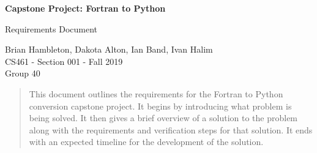 \begin{titlepage}
   \begin{center}
       \vspace*{1cm}
 
       \begin{center}
            \Large
            \textbf{Capstone Project: Fortran to Python}
        \end{center}{}
     
        \vspace{0.2cm}
        Requirements Document\\
        \vspace{0.3cm}
        
        Brian Hambleton, Dakota Alton, Ian Band, Ivan Halim\\
        CS461 - Section 001 - Fall 2019\\
        Group 40
        
 
        \vspace{1.5cm}
 
        \begin{abstract}
          This document outlines the requirements for the Fortran to Python conversion capstone project. It begins by introducing what problem is being solved. It then gives a brief overview of a solution to the problem along with the requirements and verification steps for that solution. It ends with an expected timeline for the development of the solution. 
        \end{abstract}
 
       \vfill
 
       \vspace{0.8cm}
   \end{center}
\end{titlepage}